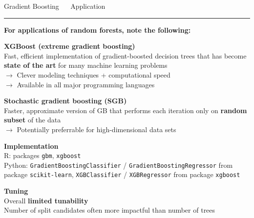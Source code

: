 \documentclass[11pt,compress,t,notes=noshow, xcolor=table]{beamer}
\begin{document}

\LARGE
\begin{frame}{\textcolor{gray!80}{Gradient Boosting} ~~ Application}
\normalsize
\vspace{-0.5cm}
\noindent \textcolor{gray!80}{\rule{\textwidth}{1pt}}

\vspace{0.3cm}

\footnotesize

\textbf{For applications of random forests, note the following:}
\lz

\textbf{\textcolor{gray!80}{XGBoost (extreme gradient boosting)}} \\
\smallskip
Fast, efficient implementation of gradient-boosted decision trees that has
become \textbf{state of the art} for many machine learning problems \\
$\rightarrow$ Clever modeling techniques + computational speed \\
$\rightarrow$ Available in all major programming languages

\lz

\textbf{\textcolor{gray!80}{Stochastic gradient boosting (SGB)}} \\
\smallskip
Faster, approximate version of GB that performs each iteration only on 
\textbf{random subset} of the data \\
$\rightarrow$ Potentially preferrable for high-dimensional data sets 

\lz

\textbf{\textcolor{gray!80}{Implementation}} \\
\smallskip
R: packages \texttt{gbm}, \texttt{xgboost}\\
Python: \texttt{GradientBoostingClassifier} / \texttt{GradientBoostingRegressor} 
from package \texttt{scikit-learn}, \texttt{XGBClassifier} / 
\texttt{XGBRegressor} from package \texttt{xgboost}
\lz

\textbf{\textcolor{gray!80}{Tuning}} \\
\smallskip
Overall \textbf{limited tunability} \\
Number of split candidates often more impactful than number of trees

\end{frame}

\end{document}
